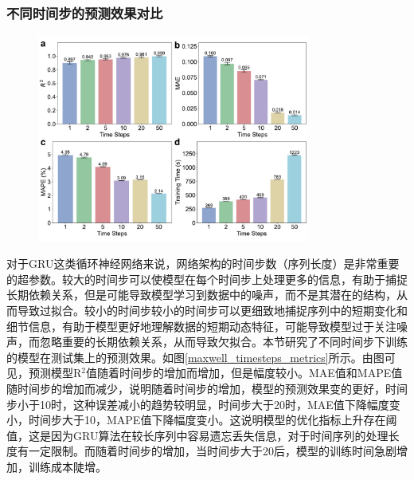 \subsubsection{不同时间步的预测效果对比}
\begin{figure}[htbp]
  \centering
  \includegraphics[width=0.8\textwidth]{Fig/Maxwell_timesteps_metrics.pdf}
\end{figure}
对于GRU这类循环神经网络来说，网络架构的时间步数（序列长度）是非常重要的超参数。较大的时间步可以使模型在每个时间步上处理更多的信息，有助于捕捉长期依赖关系，但是可能导致模型学习到数据中的噪声，而不是其潜在的结构，从而导致过拟合。较小的时间步较小的时间步可以更细致地捕捉序列中的短期变化和细节信息，有助于模型更好地理解数据的短期动态特征，可能导致模型过于关注噪声，而忽略重要的长期依赖关系，从而导致欠拟合。本节研究了不同时间步下训练的模型在测试集上的预测效果。如图\ref{maxwell_timesteps_metrics}所示。由图可见，预测模型R$^2$值随着时间步的增加而增加，但是幅度较小。MAE值和MAPE值随时间步的增加而减少，说明随着时间步的增加，模型的预测效果变的更好，时间步小于10时，这种误差减小的趋势较明显，时间步大于20时，MAE值下降幅度变小，时间步大于10，MAPE值下降幅度变小。这说明模型的优化指标上升存在阈值，这是因为GRU算法在较长序列中容易遗忘丢失信息，对于时间序列的处理长度有一定限制。而随着时间步的增加，当时间步大于20后，模型的训练时间急剧增加，训练成本陡增。

